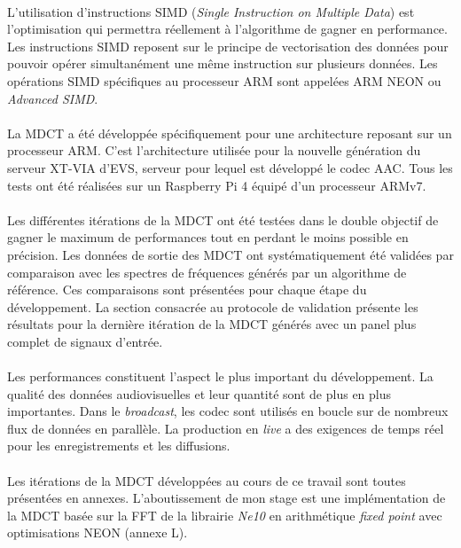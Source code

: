 \documentclass{article}
\begin{document}
    \paragraph{}
    L'utilisation d'instructions SIMD (\emph{Single Instruction on Multiple Data}) est l'optimisation qui permettra réellement à l'algorithme de gagner en performance. Les instructions SIMD reposent sur le principe de vectorisation des données pour pouvoir opérer simultanément une même instruction sur plusieurs données. Les opérations SIMD spécifiques au processeur ARM sont appelées ARM NEON ou \emph{Advanced SIMD}.

    \paragraph{}
    La MDCT a été développée spécifiquement pour une architecture reposant sur un processeur ARM. C'est l'architecture utilisée pour la nouvelle génération du serveur XT-VIA d'EVS, serveur pour lequel est développé le codec AAC. Tous les tests ont été réalisées sur un Raspberry Pi 4 équipé d'un processeur ARMv7.

    \paragraph{}
    Les différentes itérations de la MDCT ont été testées dans le double objectif de gagner le maximum de performances tout en perdant le moins possible en précision. Les données de sortie des MDCT ont systématiquement été validées par comparaison avec les spectres de fréquences générés par un algorithme de référence. Ces comparaisons sont présentées pour chaque étape du développement. La section consacrée au protocole de validation présente les résultats pour la dernière itération de la MDCT générés avec un panel plus complet de signaux d'entrée.

    \paragraph{}
    Les performances constituent l'aspect le plus important du développement. La qualité des données audiovisuelles et leur quantité sont de plus en plus importantes. Dans le \emph{broadcast}, les codec sont utilisés en boucle sur de nombreux flux de données en parallèle. La production en \emph{live} a des exigences de temps réel pour les enregistrements et les diffusions.

    \paragraph{}
    Les itérations de la MDCT développées au cours de ce travail sont toutes présentées en annexes. L'aboutissement de mon stage est une implémentation de la MDCT basée sur la FFT de la librairie \emph{Ne10} en arithmétique \emph{fixed point} avec optimisations NEON (annexe L).
\end{document}
